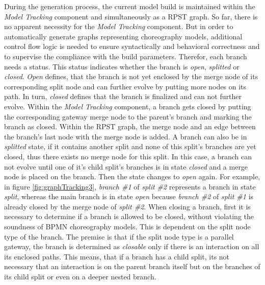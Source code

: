 During the generation process, the current model build is maintained within the \textit{Model Tracking} component and simultaneously as a RPST graph. So far, there is no apparent necessity for the \textit{Model Tracking} component. But in order to automatically generate graphs representing choreography models, additional control flow logic is needed to ensure syntactically and behavioral correctness and to supervise the compliance with the build parameters. Therefor, each branch needs a status. This status indicates whether the branch is \textit{open}, \textit{splitted} or \textit{closed}. \textit{Open} defines, that the branch is not yet enclosed by the merge node of its corresponding split node and can further evolve by putting more nodes on its path. In turn, \textit{closed} defines that the branch is finalized and can not further evolve. Within the \textit{Model Tracking} component, a branch gets closed by putting the corresponding gateway merge node to the parent's branch and marking the branch as closed. Within the RPST graph, the merge node and an edge between the branch's last node with the merge node is added. A branch can also be in \textit{splitted} state, if it contains another split and none of this split's branches are yet closed, thus there exists no merge node for this split. In this case, a branch can not evolve until one of it's child split's branches is in state \textit{closed} and a merge node is placed on the branch. Then the state changes to \textit{open} again. For example, in figure \ref{fig:graphTracking3}, \textit{branch \#1} of \textit{split \#2} represents a branch in state \textit{split}, whereas the main branch is in state \textit{open} because \textit{branch \#2} of \textit{split \#1} is already closed by the merge node of \textit{split \#2}. When closing a branch, first it is necessary to determine if a branch is allowed to be closed, without violating the soundness of BPMN choreography models. This is dependent on the split node type of the branch. The premise is that if the split node type is a parallel gateway, the branch is determined as \textit{closable} only if there is an interaction on all its enclosed paths. This means, that if a branch has a child split, its not necessary that an interaction is on the parent branch itself but on the branches of its child split or even on a deeper nested branch.


